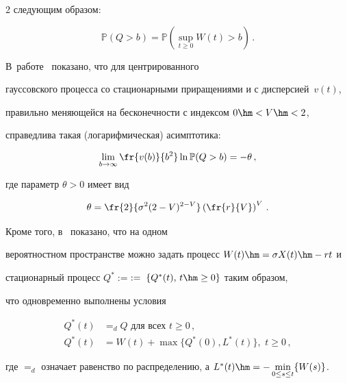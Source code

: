 \begin{multicols}{2}
следующим образом:


\begin{equation*}


\mathbb{P}( Q>b) = \mathbb{P}\left(\sup\limits_{t \geq 0}W(t)>b\right)\,.


\end{equation*}


В~работе~\cite{Duffy} показано, что для центрированного


гауссовского процесса со стационарными приращениями и с дисперсией~$v(t)$, 


правильно меняющейся на бесконечности  с индексом $0\hm<V\hm<2$,


справедлива такая (логарифмическая) асимптотика:


\begin{equation}


\lim\limits_{b \to \infty} \fr{v(b)}{b^2} \ln \mathbb{P}(Q>b)=-\theta\,,


\label{asymp1-l13}


\end{equation}


где параметр $\theta>0$ имеет   вид


\begin{equation}


\theta=\fr{2}{\sigma^2(2-V)^{2-V}}\left( \fr{r}{V}


\right)^V\,.


\label{e11-ml}


\end{equation}


Кроме того, в~\cite{Konstantopoulos} показано, что на одном


веро\-ят\-ностном пространстве можно задать процесс $W(t)\hm=\sigma X(t)\hm-rt$ и


стационарный процесс $Q^*:=$\linebreak $:=\;\{Q^*(t),\, t\hm \geq 0\}$ таким образом,


что одновременно выполнены условия


\begin{align}


Q^*(t)&=_d Q \mbox{ для всех } t \geq 0\,,\label{e15-ml}\\


Q^*(t)&=W(t)+\max\{Q^*(0), L^*(t)\},\,\, t \geq 0\,,\label{e16-ml}


\end{align}


где $=_d$ означает равенство по распределению, а $L^*(t)\hm=-\min\limits_{0\le s\le t}\{W(s)\}$. 



\end{multicols}
